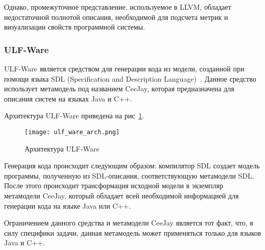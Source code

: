 Однако, промежуточное представление, используемое в LLVM, обладает
недостаточной полнотой описания, необходимой для подсчета метрик и визуализации
свойств программной системы.

\subsubsection{ULF-Ware}



ULF-Ware является средством для генерации кода из модели, созданной при помощи
языка SDL (Specification and Description Language)~\cite{metamodeling}. Данное
средство использует метамодель под названием CeeJay, которая предназначена для
описания систем на языках Java и C++.

Архитектура ULF-Ware приведена на рис~\ref{fig:ulf_ware_arch}.

\begin{figure}[ht!]
    \begin{center}
        \texttt{[image: ulf\_ware\_arch.png]}
    \end{center}
    \caption{Архитектура ULF-Ware}
    \label{fig:ulf_ware_arch}
\end{figure}

Генерация кода происходит следующим образом: компилятор SDL создает модель
программы, полученную из SDL-описания, соответствующую метамодели SDL. После
этого происходит трансформация исходной модели в экземпляр метамодели CeeJay,
который обладает всей необходимой информацией для генерации кода на языке Java
или C++.

Ограничением данного средства и метамодели CeeJay является тот факт, что, в силу
специфики задачи, данная метамодель может применяться только для языков Java и
C++.
